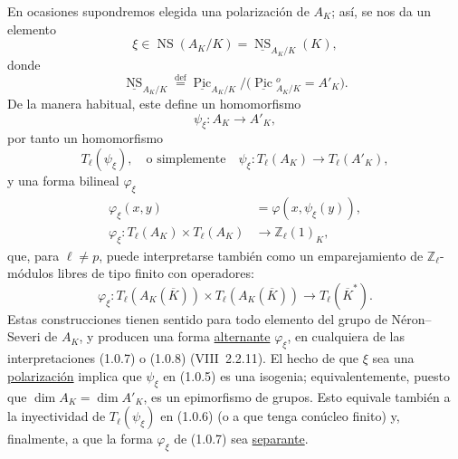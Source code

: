En ocasiones supondremos elegida una polarización de $A_K$; así, se
nos da un elemento
\begin{equation}\tag{1.0.4}
 \xi\in\operatorname{NS}(A_K/K)
 =\underline{\operatorname{NS}}_{A_K/K}(K),
\end{equation}
donde
\[
 \underline{\operatorname{NS}}_{A_K/K}
 \overset{\mathrm{def}}{=}
 \underline{\operatorname{Pic}}_{A_K/K}/
 \bigl(\underline{\operatorname{Pic}}{}^o_{A_K/K}=A'_K\bigr).
\]
De la manera habitual, este define un homomorfismo
\begin{equation}\tag{1.0.5}
 \psi_\xi:A_K\longrightarrow A'_K,
\end{equation}
por tanto un homomorfismo
\begin{equation}\tag{1.0.6}
 T_\ell(\psi_\xi),\quad\text{o simplemente}\quad
 \psi_\xi:T_\ell(A_K)\longrightarrow T_\ell(A'_K),
\end{equation}
y una forma bilineal $\varphi_\xi$
\begin{equation}\tag{1.0.7}
 \begin{split}
 \varphi_\xi(x,y)&=\varphi(x,\psi_\xi(y)),\\
 \varphi_\xi:T_\ell(A_K)\times T_\ell(A_K)
 &\longrightarrow\mathbb Z_\ell(1)_K,
 \end{split}
\end{equation}
que, para $\ell\ne p$, puede interpretarse también como un
emparejamiento de $\mathbb Z_\ell$-módulos libres de tipo finito con
operadores:
\begin{equation}\tag{1.0.8}
 \varphi_\xi:T_\ell(A_K(\overline K))\times
 T_\ell(A_K(\overline K))\longrightarrow T_\ell(\overline K^*).
\end{equation}
Estas construcciones tienen sentido para todo elemento del grupo de
Néron--Severi de $A_K$, y producen una forma \underline{alternante}
$\varphi_\xi$, en cualquiera de las interpretaciones (1.0.7) o (1.0.8)
(VIII~2.2.11). El hecho de que $\xi$ sea una \underline{polarización}
implica que $\psi_\xi$ en (1.0.5) es una isogenia; equivalentemente,
puesto que $\dim A_K=\dim A'_K$, es un epimorfismo de grupos. Esto
equivale también a la inyectividad de $T_\ell(\psi_\xi)$ en (1.0.6)
(o a que tenga conúcleo finito) y, finalmente, a que la forma
$\varphi_\xi$ de (1.0.7) sea \underline{separante}.

